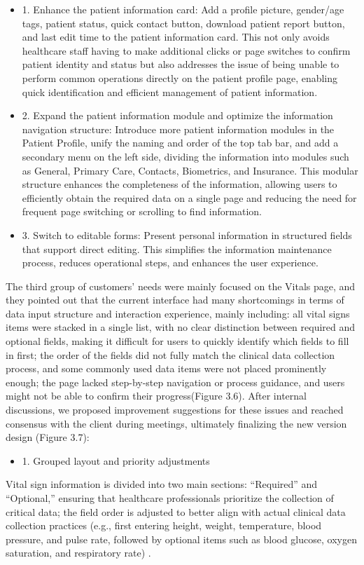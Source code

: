 \begin{itemize}
    \item 1. Enhance the patient information card: Add a profile picture, gender/age tags, patient status, quick contact button, download patient report button, and last edit time to the patient information card. This not only avoids healthcare staff having to make additional clicks or page switches to confirm patient identity and status but also addresses the issue of being unable to perform common operations directly on the patient profile page, enabling quick identification and efficient management of patient information.
    \item 2. Expand the patient information module and optimize the information navigation structure: Introduce more patient information modules in the Patient Profile, unify the naming and order of the top tab bar, and add a secondary menu on the left side, dividing the information into modules such as General, Primary Care, Contacts, Biometrics, and Insurance. This modular structure enhances the completeness of the information, allowing users to efficiently obtain the required data on a single page and reducing the need for frequent page switching or scrolling to find information.
    \item 3. Switch to editable forms: Present personal information in structured fields that support direct editing. This simplifies the information maintenance process, reduces operational steps, and enhances the user experience.
\end{itemize}
The third group of customers' needs were mainly focused on the Vitals page, and they pointed out that the current interface had many shortcomings in terms of data input structure and interaction experience, mainly including: all vital signs items were stacked in a single list, with no clear distinction between required and optional fields, making it difficult for users to quickly identify which fields to fill in first; the order of the fields did not fully match the clinical data collection process, and some commonly used data items were not placed prominently enough; the page lacked step-by-step navigation or process guidance, and users might not be able to confirm their progress(Figure 3.6). After internal discussions, we proposed improvement suggestions for these issues and reached consensus with the client during meetings, ultimately finalizing the new version design (Figure 3.7):

\begin{itemize}
    \item 1. Grouped layout and priority adjustments
\end{itemize}
Vital sign information is divided into two main sections: “Required” and “Optional,” ensuring that healthcare professionals prioritize the collection of critical data; the field order is adjusted to better align with actual clinical data collection practices (e.g., first entering height, weight, temperature, blood pressure, and pulse rate, followed by optional items such as blood glucose, oxygen saturation, and respiratory rate) \cite{webform}.

